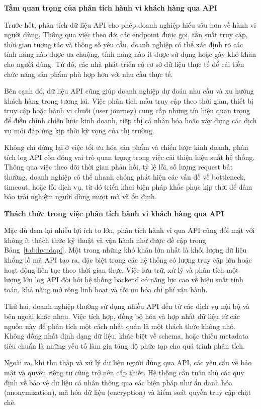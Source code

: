 \documentclass{uetgraduation}
\begin{document}
\textbf{Tầm quan trọng của phân tích hành vi khách hàng qua API}

Trước hết, phân tích dữ liệu API cho phép doanh nghiệp hiểu sâu hơn về hành vi người dùng. Thông qua việc theo dõi các endpoint được gọi, tần suất truy cập, thời gian tương tác và thông số yêu cầu, doanh nghiệp có thể xác định rõ các tính năng nào được ưa chuộng, tính năng nào ít được sử dụng hoặc gây khó khăn cho người dùng. Từ đó, các nhà phát triển có cơ sở dữ liệu thực tế để cải tiến chức năng sản phẩm phù hợp hơn với nhu cầu thực tế.

Bên cạnh đó, dữ liệu API cũng giúp doanh nghiệp dự đoán nhu cầu và xu hướng khách hàng trong tương lai. Việc phân tích mẫu truy cập theo thời gian, thiết bị truy cập hoặc hành vi chuỗi (user journey) cung cấp những tín hiệu quan trọng để điều chỉnh chiến lược kinh doanh, tiếp thị cá nhân hóa hoặc xây dựng các dịch vụ mới đáp ứng kịp thời kỳ vọng của thị trường.

Không chỉ dừng lại ở việc tối ưu hóa sản phẩm và chiến lược kinh doanh, phân tích log API còn đóng vai trò quan trọng trong việc cải thiện hiệu suất hệ thống. Thông qua việc theo dõi thời gian phản hồi, tỷ lệ lỗi, số lượng request bất thường, doanh nghiệp có thể nhanh chóng phát hiện các vấn đề về bottleneck, timeout, hoặc lỗi dịch vụ, từ đó triển khai biện pháp khắc phục kịp thời để đảm bảo trải nghiệm người dùng mượt mà và ổn định.

\textbf{Thách thức trong việc phân tích hành vi khách hàng qua API}

Mặc dù đem lại nhiều lợi ích to lớn, phân tích hành vi qua API cũng đối mặt với không ít thách thức kỹ thuật và vận hành như được đề cập trong Bảng~\ref{tab:hvndapi}. Một trong những khó khăn lớn nhất là khối lượng dữ liệu khổng lồ mà API tạo ra, đặc biệt trong các hệ thống có lượng truy cập lớn hoặc hoạt động liên tục theo thời gian thực. Việc lưu trữ, xử lý và phân tích một lượng lớn log API đòi hỏi hệ thống backend có năng lực cao về hiệu suất tính toán, khả năng mở rộng linh hoạt và tối ưu hóa chi phí vận hành.

Thứ hai, doanh nghiệp thường sử dụng nhiều API đến từ các dịch vụ nội bộ và bên ngoài khác nhau. Việc tích hợp, đồng bộ hóa và hợp nhất dữ liệu từ các nguồn này để phân tích một cách nhất quán là một thách thức không nhỏ. Không đồng nhất định dạng dữ liệu, khác biệt về schema, hoặc thiếu metadata tiêu chuẩn là những yếu tố làm gia tăng độ phức tạp cho quá trình phân tích.

Ngoài ra, khi thu thập và xử lý dữ liệu người dùng qua API, các yêu cầu về bảo mật và quyền riêng tư cũng trở nên cấp thiết. Hệ thống cần tuân thủ các quy định về bảo vệ dữ liệu cá nhân thông qua các biện pháp như ẩn danh hóa (anonymization), mã hóa dữ liệu (encryption) và kiểm soát quyền truy cập chặt chẽ.
\end{document}
